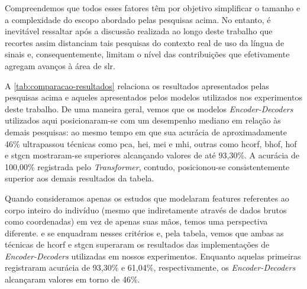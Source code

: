 Compreendemos que todos esses fatores têm por objetivo simplificar o tamanho e a complexidade do escopo abordado pelas pesquisas acima. No entanto, é inevitável ressaltar após a discussão realizada ao longo deste trabalho que recortes assim distanciam tais pesquisas do contexto real de uso da língua de sinais e, consequentemente, limitam o nível das contribuições que efetivamente agregam avanços à área de \acrshort{slr}.






A \autoref{tab:comparacao-resultados} relaciona os resultados apresentados pelas pesquisas acima e aqueles apresentados pelos modelos utilizados nos experimentos deste trabalho.
De uma maneira geral, vemos que os modelos \textit{Encoder-Decoders} utilizados aqui posicionaram-se com um desempenho mediano em relação às demais pesquisas: ao mesmo tempo em que sua acurácia de aproximadamente 46\% ultrapassou técnicas como \acrshort{pca}, \acrshort{hei}, \acrshort{mei} e \acrshort{mhi}, outras como \acrshort{hcorf}, \acrshort{bhof}, \acrshort{hof} e \acrshort{stgcn} mostraram-se superiores alcançando valores de até 93,30\%.
A acurácia de 100,00\% registrada pelo \textit{Transformer}, contudo, posicionou-se consistentemente superior aos demais resultados da tabela.

Quando consideramos apenas os estudos que modelaram features referentes ao corpo inteiro do indivíduo (mesmo que indiretamente através de dados brutos como coordenadas) em vez de apenas suas mãos, temos uma perspectiva diferente.  e  se enquadram nesses critérios e, pela tabela, vemos que ambas as técnicas de \acrshort{hcorf} e \acrshort{stgcn} superaram os resultados das implementações de \textit{Encoder-Decoders} utilizadas em nossos experimentos. Enquanto aquelas primeiras registraram acurácia de 93,30\% e 61,04\%, respectivamente, os \textit{Encoder-Decoders} alcançaram valores em torno de 46\%.


